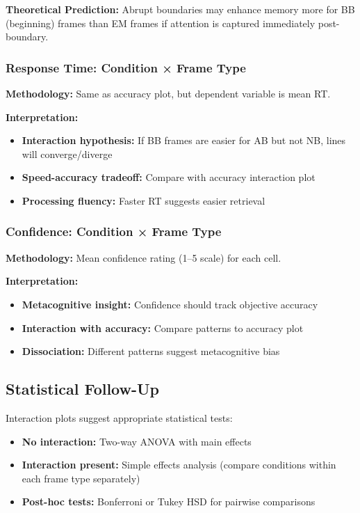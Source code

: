 \documentclass[12pt,a4paper]{article}
\begin{document}
\textbf{Theoretical Prediction:} Abrupt boundaries may enhance memory more for BB (beginning) frames than EM frames if attention is captured immediately post-boundary.

\subsubsection{Response Time: Condition × Frame Type}

\textbf{Methodology:} Same as accuracy plot, but dependent variable is mean RT.

\textbf{Interpretation:}
\begin{itemize}
    \item \textbf{Interaction hypothesis:} If BB frames are easier for AB but not NB, lines will converge/diverge
    \item \textbf{Speed-accuracy tradeoff:} Compare with accuracy interaction plot
    \item \textbf{Processing fluency:} Faster RT suggests easier retrieval
\end{itemize}

\subsubsection{Confidence: Condition × Frame Type}

\textbf{Methodology:} Mean confidence rating (1--5 scale) for each cell.

\textbf{Interpretation:}
\begin{itemize}
    \item \textbf{Metacognitive insight:} Confidence should track objective accuracy
    \item \textbf{Interaction with accuracy:} Compare patterns to accuracy plot
    \item \textbf{Dissociation:} Different patterns suggest metacognitive bias
\end{itemize}

\subsection{Statistical Follow-Up}

Interaction plots suggest appropriate statistical tests:
\begin{itemize}
    \item \textbf{No interaction:} Two-way ANOVA with main effects
    \item \textbf{Interaction present:} Simple effects analysis (compare conditions within each frame type separately)
    \item \textbf{Post-hoc tests:} Bonferroni or Tukey HSD for pairwise comparisons
\end{itemize}
\end{document}
